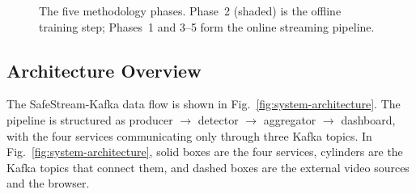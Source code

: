 \documentclass[conference]{IEEEtran}
\begin{document}
\begin{figure}[t]
\centering
{}
\caption{The five methodology phases. Phase~2 (shaded) is the offline training
step; Phases~1 and 3--5 form the online streaming pipeline.}
\label{fig:methodology-phases}
\end{figure}

\subsection{Architecture Overview}
\label{subsec:architecture}

The SafeStream-Kafka data flow is shown in
Fig.~\ref{fig:system-architecture}. The pipeline is structured as producer
$\rightarrow$ detector $\rightarrow$ aggregator $\rightarrow$ dashboard, with
the four services communicating only through three Kafka topics. In
Fig.~\ref{fig:system-architecture}, solid boxes are the four services, cylinders
are the Kafka topics that connect them, and dashed boxes are the external video
sources and the browser.
\end{document}
